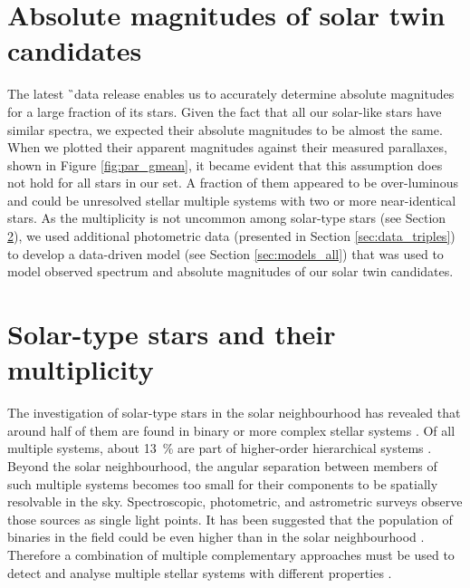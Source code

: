 \section{Absolute magnitudes of solar twin candidates}
\label{sec:abs_mag_triple}
The latest \G\ data release enables us to accurately determine absolute magnitudes for a large fraction of its stars. Given the fact that all our solar-like stars have similar spectra, we expected their absolute magnitudes to be almost the same. When we plotted their apparent magnitudes against their measured parallaxes, shown in Figure \ref{fig:par_gmean}, it became evident that this assumption does not hold for all stars in our set. A fraction of them appeared to be over-luminous and could be unresolved stellar multiple systems with two or more near-identical stars. As the multiplicity is not uncommon among solar-type stars (see Section \ref{sec:multiplicity_intro_twins}), we used additional photometric data (presented in Section \ref{sec:data_triples}) to develop a data-driven model (see Section \ref{sec:models_all}) that was used to model observed spectrum and absolute magnitudes of our solar twin candidates.

\section{Solar-type stars and their multiplicity}
\label{sec:multiplicity_intro_twins}
The investigation of solar-type stars in the solar neighbourhood has revealed that around half of them are found in binary or more complex stellar systems \cite{2010ApJS..190....1R, 2013ARA&A..51..269D, 2017ApJS..230...15M}. Of all multiple systems, about 13~\% are part of higher-order hierarchical systems \cite{2010ApJS..190....1R, 2014AJ....147...87T}. Beyond the solar neighbourhood, the angular separation between members of such multiple systems becomes too small for their components to be spatially resolvable in the sky. Spectroscopic, photometric, and astrometric surveys observe those sources as single light points. It has been suggested that the population of binaries in the field could be even higher than in the solar neighbourhood \cite{2000A&A...361..770Q}. Therefore a combination of multiple complementary approaches must be used to detect and analyse multiple stellar systems with different properties \cite{2017ApJS..230...15M}.

